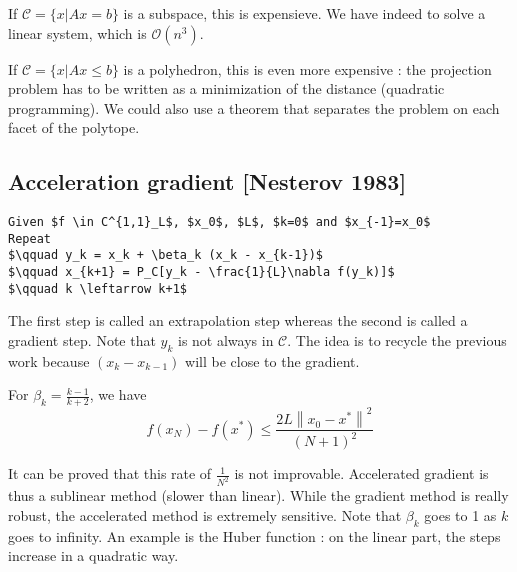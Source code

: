 \begin{example}
\begin{leftbar}
If $\mathcal{C}=\{x|Ax=b\}$ is a subspace, this is expensieve. We have indeed to solve a linear system, which is $\mathcal{O}(n^3)$.
\end{leftbar}
\end{example}

\begin{example}
\begin{leftbar}
If $\mathcal{C}=\{x|Ax\leq b\}$ is a polyhedron, this is even more expensive : the projection problem has to be written as a minimization of the distance (quadratic programming). We could also use a theorem that separates the problem on each facet of the polytope.
\end{leftbar}
\end{example}


\subsection{Acceleration gradient [Nesterov 1983]}


\begin{lstlisting}[mathescape,caption=Acceleration gradient]
Given $f \in C^{1,1}_L$, $x_0$, $L$, $k=0$ and $x_{-1}=x_0$
Repeat 
$\qquad y_k = x_k + \beta_k (x_k - x_{k-1})$
$\qquad x_{k+1} = P_C[y_k - \frac{1}{L}\nabla f(y_k)]$
$\qquad k \leftarrow k+1$
\end{lstlisting}

The first step is called an extrapolation step whereas the second is called a gradient step. Note that $y_k$ is not always in $\mathcal{C}$. The idea is to recycle the previous work because $(x_k - x_{k-1})$ will be close to the gradient.

\begin{theorem}
For $\beta_k=\frac{k-1}{k+2}$, we have
\begin{equation*}
f(x_N) -  f(x^*) \leq \frac{2L\left\|x_0 - x^*\right\|^2}{(N+1)^2}
\end{equation*}
\end{theorem}

It can be proved that this rate of $\frac{1}{N^2}$ is not improvable. Accelerated gradient is thus a sublinear method (slower than linear). While the gradient method is really robust, the accelerated method is extremely sensitive. Note that $\beta_k$ goes to 1 as $k$ goes to infinity. An example is the Huber function : on the linear part, the steps increase in a quadratic way.\\

